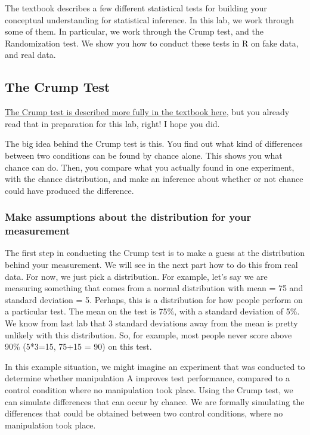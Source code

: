 \documentclass[]{book}
\begin{document}
The textbook describes a few different statistical tests for building
your conceptual understanding for statistical inference. In this lab, we
work through some of them. In particular, we work through the Crump
test, and the Randomization test. We show you how to conduct these tests
in R on fake data, and real data.

\subsection{The Crump Test}\label{the-crump-test}

\href{https://crumplab.github.io/statistics/foundations-for-inference.html\#the-crump-test}{The
Crump test is described more fully in the textbook here}, but you
already read that in preparation for this lab, right! I hope you did.

The big idea behind the Crump test is this. You find out what kind of
differences between two conditions can be found by chance alone. This
shows you what chance can do. Then, you compare what you actually found
in one experiment, with the chance distribution, and make an inference
about whether or not chance could have produced the difference.

\subsubsection{Make assumptions about the distribution for your
measurement}\label{make-assumptions-about-the-distribution-for-your-measurement}

The first step in conducting the Crump test is to make a guess at the
distribution behind your measurement. We will see in the next part how
to do this from real data. For now, we just pick a distribution. For
example, let's say we are measuring something that comes from a normal
distribution with mean = 75 and standard deviation = 5. Perhaps, this is
a distribution for how people perform on a particular test. The mean on
the test is 75\%, with a standard deviation of 5\%. We know from last
lab that 3 standard deviations away from the mean is pretty unlikely
with this distribution. So, for example, most people never score above
90\% (5*3=15, 75+15 = 90) on this test.

In this example situation, we might imagine an experiment that was
conducted to determine whether manipulation A improves test performance,
compared to a control condition where no manipulation took place. Using
the Crump test, we can simulate differences that can occur by chance. We
are formally simulating the differences that could be obtained between
two control conditions, where no manipulation took place.
\end{document}
